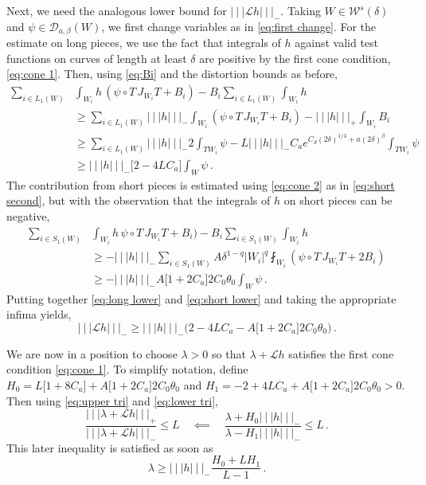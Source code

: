 \documentclass{amsart}
\numberwithin{equation}{section}
\newcommand\cD{{\mathcal D}}
\newcommand\cL{{\mathcal L}}
\newcommand\cW{{\mathcal W}}
\newcommand{\tri}{{|\:\!\!|\:\!\!|}}
\begin{document}
Next, we need the analogous lower bound for $\tri \cL h \tri_-$.  Taking $W \in \cW^s(\delta)$ 
and $\psi \in \cD_{a, \beta}(W)$, we first change variables as in \eqref{eq:first change}.
For the estimate on long pieces, we use the fact that integrals of $h$ against valid test functions
on curves of length at least $\delta$ are positive by the first cone condition, \eqref{eq:cone 1}.
Then, using \eqref{eq:Bi} and the distortion bounds as before,
\begin{equation}
\label{eq:long lower}
\begin{split}
\sum_{i \in L_1(W)} &\int_{W_i} h \,  (\psi \circ T \, J_{W_i}T + B_i) - B_i \sum_{i \in L_1(W)} \int_{W_i} h 
\\
& \ge \sum_{i \in L_1(W)} \tri h \tri_- \int_{W_i}  (\psi \circ T \, J_{W_i} T + B_i) 
- \tri h \tri_+ \int_{W_i} B_i \\
& \ge \sum_{i \in L_1(W)} \tri h \tri_- 2 \int_{TW_i} \psi - L \tri h \tri_- C_a e^{C_d (2\delta)^{1/3} +a (2\delta)^\beta} \int_{TW_i} \psi \\
&  \ge \tri h \tri_- \big[ 2 -  4L C_a \big]  \int_W \psi \, .
\end{split}
\end{equation}
The contribution from short pieces is estimated using \eqref{eq:cone 2} as in \eqref{eq:short second},
but with the observation that the integrals of $h$ on short pieces can be negative,
\begin{equation}
\label{eq:short lower}
\begin{split}
\sum_{i \in S_1(W)} & \int_{W_i} h \, \psi \circ T \, J_{W_i}T  + B_i) - B_i \sum_{i \in S_1(W)} \int_{W_i} h 
\\
& \ge - \tri h \tri_- \sum_{i \in S_1(W)} A \delta^{1-q} |W_i|^q \fint_{W_i}  (\psi \circ T \, J_{W_i} T + 2B_i) 
\\
& \ge - \tri h \tri_-  A \big[ 1+2 C_a\big] 2 C_0 \theta_0 \int_W \psi \, .
\end{split}
\end{equation}
Putting together \eqref{eq:long lower} and \eqref{eq:short lower} and taking the appropriate infima yields,
\begin{equation}
\label{eq:lower tri}
\tri \cL h \tri_- \ge \tri h \tri_- \Big( 2 - 4LC_a - A \big[ 1+2 C_a \big] 2 C_0 \theta_0 \Big) \, .
\end{equation}

We are now in a position to choose $\lambda>0$ so that $\lambda + \cL h$ satisfies the
first cone condition \eqref{eq:cone 1}.  To simplify notation, define
$H_0 = L \big[ 1 + 8 C_a\big]
+ A \big[ 1+2 C_a \big] 2 C_0 \theta_0$ and
$H_1 = -2 + 4L C_a + A \big[ 1+2 C_a \big] 2 C_0 \theta_0 >0$.
Then using \eqref{eq:upper tri} and \eqref{eq:lower tri},
\[
\frac{\tri \lambda + \cL h \tri_+}{\tri \lambda + \cL h \tri_-}
\le L \quad \impliedby \quad \frac{\lambda + H_0 \tri h \tri_-}{\lambda - H_1 \tri h \tri_-} \le L \, .
\]
This later inequality is satisfied as soon as
\begin{equation}
\label{eq:cone 1 check}
\lambda \ge \tri h \tri_- \frac{H_0 + L H_1}{L-1} \, .
\end{equation}
\end{document}
